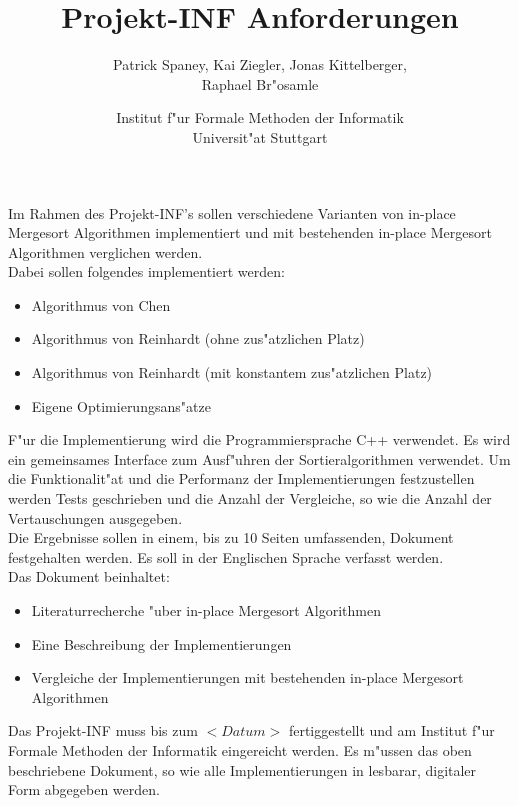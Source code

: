 \documentclass[12pt,pdftex,a4paper]{article}
\begin{document}
\title{Projekt-INF Anforderungen}
\author{Patrick Spaney, Kai Ziegler, Jonas Kittelberger, \\ Raphael Br"osamle}
\date{Institut f"ur Formale Methoden der Informatik \\ Universit"at Stuttgart}
\maketitle
Im Rahmen des Projekt-INF's sollen verschiedene Varianten von in-place Mergesort Algorithmen implementiert und mit bestehenden in-place Mergesort Algorithmen verglichen werden. \\
Dabei sollen folgendes implementiert werden:
\begin{itemize}
\item Algorithmus von Chen
\item Algorithmus von Reinhardt (ohne zus"atzlichen Platz)
\item Algorithmus von Reinhardt (mit konstantem zus"atzlichen Platz)
\item Eigene Optimierungsans"atze
\end{itemize}
F"ur die Implementierung wird die Programmiersprache C++ verwendet. Es wird ein gemeinsames Interface zum Ausf"uhren der Sortieralgorithmen verwendet. Um die Funktionalit"at und die Performanz der Implementierungen festzustellen werden Tests geschrieben und die Anzahl der Vergleiche, so wie die Anzahl der Vertauschungen ausgegeben.\\
Die Ergebnisse sollen in einem, bis zu 10 Seiten umfassenden, Dokument festgehalten werden. Es soll in der Englischen Sprache verfasst werden.  \\
Das Dokument beinhaltet: 
\begin{itemize}
\item Literaturrecherche "uber in-place Mergesort Algorithmen
\item Eine Beschreibung der Implementierungen
\item Vergleiche der Implementierungen mit bestehenden in-place Mergesort Algorithmen
\end{itemize}
Das Projekt-INF muss bis zum $<Datum>$ fertiggestellt und am Institut f"ur Formale Methoden der Informatik eingereicht werden. Es m"ussen das oben beschriebene Dokument, so wie alle Implementierungen in lesbarar, digitaler Form abgegeben werden.
\end{document}
